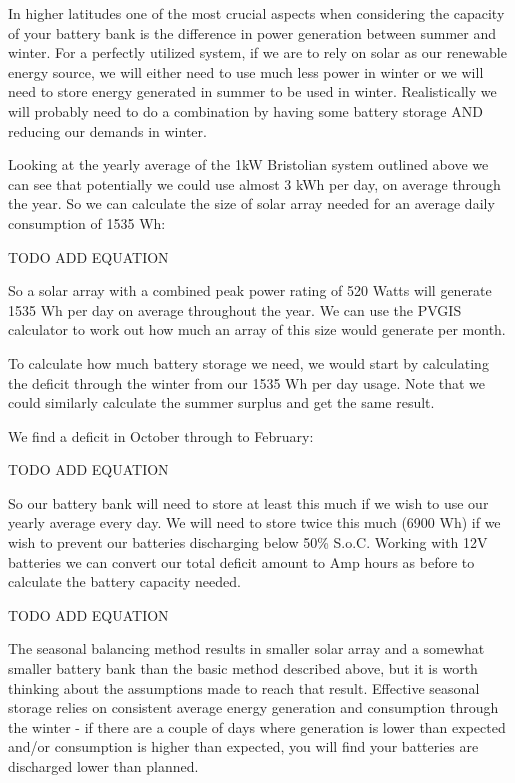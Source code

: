 \documentclass{article}
\theoremstyle{definition}
\theoremstyle{definition}
\theoremstyle{remark}
\begin{document}
    In higher latitudes one of the most crucial aspects when considering the capacity of your battery bank is the difference in power generation between summer and winter. For a perfectly utilized system, if we are to rely on solar as our renewable energy source, we will either need to use much less power in winter or we will need to store energy generated in summer to be used in winter. Realistically we will probably need to do a combination by having some battery storage AND reducing our demands in winter.

    Looking at the yearly average of the 1kW Bristolian system outlined above we can see that potentially we could use almost 3 kWh per day, on average through the year. So we can calculate the size of solar array needed for an average daily consumption of 1535 Wh:

    TODO ADD EQUATION

    So a solar array with a combined peak power rating of 520 Watts will generate 1535 Wh per day on average throughout the year. We can use the PVGIS calculator to work out how much an array of this size would generate per month.

    To calculate how much battery storage we need, we would start by calculating the deficit through the winter from our 1535 Wh per day usage. Note that we could similarly calculate the summer surplus and get the same result.

    We find a deficit in October through to February:

    TODO ADD EQUATION

    So our battery bank will need to store at least this much if we wish to use our yearly average every day. We will need to store twice this much (6900 Wh) if we wish to prevent our batteries discharging below 50\% S.o.C. Working with 12V batteries we can convert our total deficit amount to Amp hours as before to calculate the battery capacity needed.

    TODO ADD EQUATION

    The seasonal balancing method results in smaller solar array and a somewhat smaller battery bank than the basic method described above, but it is worth thinking about the assumptions made to reach that result. Effective seasonal storage relies on consistent average energy generation and consumption through the winter - if there are a couple of days where generation is lower than expected and/or consumption is higher than expected, you will find your batteries are discharged lower than planned. 
\end{document}
